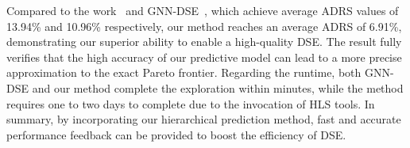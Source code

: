 \documentclass[conference]{IEEEtran}
\begin{document}
Compared to the work~\cite{wu2022high} and GNN-DSE~\cite{sohrabizadeh2022gnn}, which achieve average ADRS values of 13.94\% and 10.96\%  respectively, our method reaches an average ADRS of 6.91\%, demonstrating our superior ability to enable a high-quality DSE. The result fully verifies that the high accuracy of our predictive model can lead to a more precise approximation to the exact Pareto frontier. Regarding the runtime, both GNN-DSE and our method complete the exploration within minutes, while the method\cite{wu2022high} requires one to two days to complete due to the invocation of HLS tools. In summary, by incorporating our hierarchical prediction method, fast and accurate performance feedback can be provided to boost the efficiency of DSE.


\end{document}

